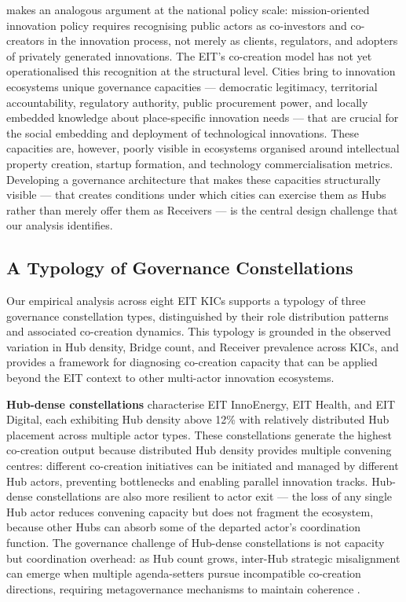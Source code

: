 \documentclass[review,12pt]{elsarticle}
\begin{document}
\citet{mazzucato2018mission} makes an analogous argument at the national policy scale: mission-oriented innovation policy requires recognising public actors as co-investors and co-creators in the innovation process, not merely as clients, regulators, and adopters of privately generated innovations. The EIT's co-creation model has not yet operationalised this recognition at the structural level. Cities bring to innovation ecosystems unique governance capacities --- democratic legitimacy, territorial accountability, regulatory authority, public procurement power, and locally embedded knowledge about place-specific innovation needs --- that are crucial for the social embedding and deployment of technological innovations. These capacities are, however, poorly visible in ecosystems organised around intellectual property creation, startup formation, and technology commercialisation metrics. Developing a governance architecture that makes these capacities structurally visible --- that creates conditions under which cities can exercise them as Hubs rather than merely offer them as Receivers --- is the central design challenge that our analysis identifies.

\subsection{A Typology of Governance Constellations}

Our empirical analysis across eight EIT KICs supports a typology of three governance constellation types, distinguished by their role distribution patterns and associated co-creation dynamics. This typology is grounded in the observed variation in Hub density, Bridge count, and Receiver prevalence across KICs, and provides a framework for diagnosing co-creation capacity that can be applied beyond the EIT context to other multi-actor innovation ecosystems.

\textbf{Hub-dense constellations} characterise EIT InnoEnergy, EIT Health, and EIT Digital, each exhibiting Hub density above 12\% with relatively distributed Hub placement across multiple actor types. These constellations generate the highest co-creation output because distributed Hub density provides multiple convening centres: different co-creation initiatives can be initiated and managed by different Hub actors, preventing bottlenecks and enabling parallel innovation tracks. Hub-dense constellations are also more resilient to actor exit --- the loss of any single Hub actor reduces convening capacity but does not fragment the ecosystem, because other Hubs can absorb some of the departed actor's coordination function. The governance challenge of Hub-dense constellations is not capacity but coordination overhead: as Hub count grows, inter-Hub strategic misalignment can emerge when multiple agenda-setters pursue incompatible co-creation directions, requiring metagovernance mechanisms to maintain coherence \citep{sorensen2017metagovernance}.
\end{document}
